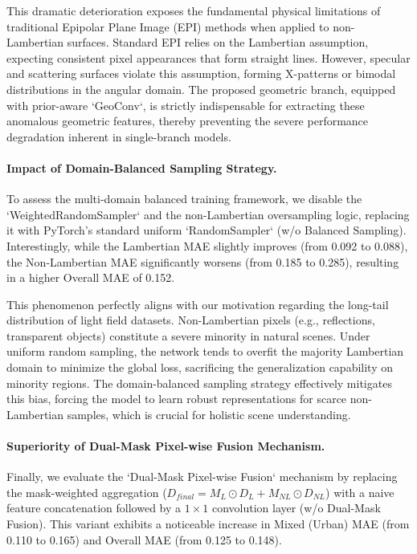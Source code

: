 \documentclass[lettersize,journal]{IEEEtran}
\begin{document}
This dramatic deterioration exposes the fundamental physical limitations of traditional Epipolar Plane Image (EPI) methods when applied to non-Lambertian surfaces. Standard EPI relies on the Lambertian assumption, expecting consistent pixel appearances that form straight lines. However, specular and scattering surfaces violate this assumption, forming X-patterns or bimodal distributions in the angular domain. The proposed geometric branch, equipped with prior-aware `GeoConv`, is strictly indispensable for extracting these anomalous geometric features, thereby preventing the severe performance degradation inherent in single-branch models.

\paragraph{Impact of Domain-Balanced Sampling Strategy.}
To assess the multi-domain balanced training framework, we disable the `WeightedRandomSampler` and the non-Lambertian oversampling logic, replacing it with PyTorch's standard uniform `RandomSampler` (w/o Balanced Sampling). Interestingly, while the Lambertian MAE slightly improves (from 0.092 to 0.088), the Non-Lambertian MAE significantly worsens (from 0.185 to 0.285), resulting in a higher Overall MAE of 0.152.

This phenomenon perfectly aligns with our motivation regarding the long-tail distribution of light field datasets. Non-Lambertian pixels (e.g., reflections, transparent objects) constitute a severe minority in natural scenes. Under uniform random sampling, the network tends to overfit the majority Lambertian domain to minimize the global loss, sacrificing the generalization capability on minority regions. The domain-balanced sampling strategy effectively mitigates this bias, forcing the model to learn robust representations for scarce non-Lambertian samples, which is crucial for holistic scene understanding.

\paragraph{Superiority of Dual-Mask Pixel-wise Fusion Mechanism.}
Finally, we evaluate the `Dual-Mask Pixel-wise Fusion` mechanism by replacing the mask-weighted aggregation ($D_{final} = M_L \odot D_L + M_{NL} \odot D_{NL}$) with a naive feature concatenation followed by a $1\times1$ convolution layer (w/o Dual-Mask Fusion). This variant exhibits a noticeable increase in Mixed (Urban) MAE (from 0.110 to 0.165) and Overall MAE (from 0.125 to 0.148). 
\end{document}
